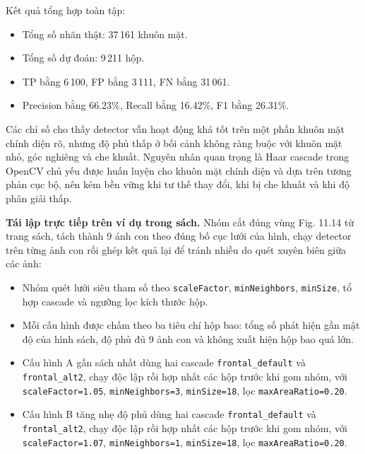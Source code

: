 Kết quả tổng hợp toàn tập:
\begin{itemize}
  \item Tổng số nhãn thật: 37\,161 khuôn mặt.
  \item Tổng số dự đoán: 9\,211 hộp.
  \item TP bằng 6\,100, FP bằng 3\,111, FN bằng 31\,061.
  \item Precision bằng 66.23\%, Recall bằng 16.42\%, F1 bằng 26.31\%.
\end{itemize}

Các chỉ số cho thấy detector vẫn hoạt động khá tốt trên một phần khuôn mặt chính diện rõ,
nhưng độ phủ thấp ở bối cảnh không ràng buộc với khuôn mặt nhỏ, góc nghiêng và che khuất.
Nguyên nhân quan trọng là Haar cascade trong OpenCV chủ yếu được huấn luyện cho khuôn mặt chính diện và dựa trên tương phản cục bộ, nên kém bền vững khi tư thế thay đổi, khi bị che khuất và khi độ phân giải thấp.

\textbf{Tái lập trực tiếp trên ví dụ trong sách.}
Nhóm cắt đúng vùng Fig. 11.14 từ trang sách, tách thành 9 ảnh con theo đúng bố cục lưới của hình,
chạy detector trên từng ảnh con rồi ghép kết quả lại để tránh nhiễu do quét xuyên biên giữa các ảnh:
\begin{itemize}
  \item Nhóm quét lưới siêu tham số theo \texttt{scaleFactor}, \texttt{minNeighbors}, \texttt{minSize}, tổ hợp cascade và ngưỡng lọc kích thước hộp.
  \item Mỗi cấu hình được chấm theo ba tiêu chí hộp bao: tổng số phát hiện gần mật độ của hình sách, độ phủ đủ 9 ảnh con và không xuất hiện hộp bao quá lớn.
\end{itemize}
\begin{itemize}
  \item Cấu hình A gần sách nhất dùng hai cascade \texttt{frontal\_default} và \texttt{frontal\_alt2}, chạy độc lập rồi hợp nhất các hộp trước khi gom nhóm, với \texttt{scaleFactor=1.05}, \texttt{minNeighbors=3}, \texttt{minSize=18}, lọc \texttt{maxAreaRatio=0.20}.
  \item Cấu hình B tăng nhẹ độ phủ dùng hai cascade \texttt{frontal\_default} và \texttt{frontal\_alt2}, chạy độc lập rồi hợp nhất các hộp trước khi gom nhóm, với \texttt{scaleFactor=1.07}, \texttt{minNeighbors=1}, \texttt{minSize=18}, lọc \texttt{maxAreaRatio=0.20}.
\end{itemize}

